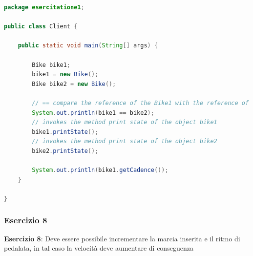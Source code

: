 \documentclass{article}
\theoremstyle{definition}
\begin{document}
\begin{lstlisting}[language=Java,escapechar=|]
package esercitatione1;

public class Client {

	public static void main(String[] args) {

		Bike bike1;
		bike1 = new Bike();
		Bike bike2 = new Bike();

		// == compare the reference of the Bike1 with the reference of the Bike2
		System.out.println(bike1 == bike2);
		// invokes the method print state of the object bike1
		bike1.printState();
		// invokes the method print state of the object bike2
		bike2.printState();

		System.out.println(bike1.getCadence());
	}

}

\end{lstlisting}


\subsubsection{Esercizio 8}
\begin{framed}
\textbf{Esercizio 8}: Deve essere possibile incrementare la marcia inserita e il ritmo di pedalata, in tal caso la velocit\`a deve aumentare di conseguenza
\end{framed}
\end{document}
